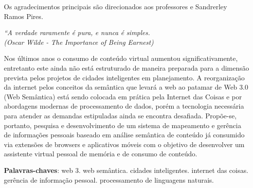 \documentclass[
	12pt,				%
	openright,			%
	twoside,			%
	a4paper,			%
	english,			%
	french,				%
	spanish,			%
	brazil				%
	]{abntex2}
\begin{document}
\begin{agradecimentos}
Os agradecimentos principais são direcionados aos professores  {\imprimirorientador} e Sandrerley Ramos Pires.

\end{agradecimentos}

\begin{epigrafe}
    \vspace*{\fill}
	\begin{flushright}
		\textit{``A verdade raramente é pura, e nunca é simples. \\
		(Oscar Wilde - The Importance of Being Earnest)}
	\end{flushright}
\end{epigrafe}


\setlength{\absparsep}{18pt} %
\begin{resumo}
 Nos últimos anos o consumo de conteúdo virtual aumentou significativamente, entretanto este ainda não está estruturado de maneira preparada para a dimensão prevista pelos projetos de cidades inteligentes em planejamento. A reorganização da internet pelos conceitos da semântica que levará a web ao patamar de Web 3.0 (Web Semântica) está sendo colocada em prática pela Internet das Coisas e por abordagens modernas de processamento de dados, porém a tecnologia necessária para atender as demandas estipuladas ainda se encontra desafiada. Propõe-se, portanto, pesquisa e desenvolvimento de um sistema de mapeamento e gerência de informações pessoais baseado em análise semântica de conteúdo já consumido via extensões de browsers e aplicativos móveis com o objetivo de desenvolver um assistente virtual pessoal de memória e de consumo de conteúdo.

 \textbf{Palavras-chaves}: web 3. web semântica. cidades inteligentes. internet das coisas. gerência de informação pessoal. processamento de linguagens naturais.
\end{resumo}
\end{document}
